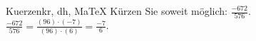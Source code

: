 \begin{MAufgabe}{Kuerzen}{kr, dh, MaTeX}
K\"urzen Sie soweit m\"oglich: $\frac{-672}{576}$.\\ 
\ifLsg\MLoesung
\quad $\frac{-672}{576}=\frac{(96)\cdot(-7)}{(96)\cdot(6)}=\frac{-7}{6}$.\else\relax\fi
 \end{MAufgabe}